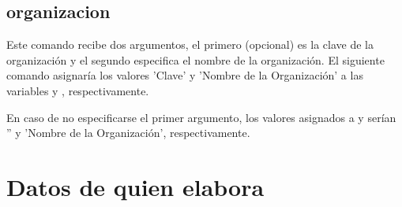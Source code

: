\subsection{organizacion}
\label{ssec:org}

    Este comando recibe dos argumentos, el primero (opcional) es la clave de la organización y el segundo especifica el nombre de la organización. El siguiente comando asignaría los valores 'Clave' y 'Nombre de la Organización' a las variables  y , respectivamente.
    
    \begin{code}
    \end{code}
    
\noindent En caso de no especificarse el primer argumento, los valores asignados a  y  serían '' y 'Nombre de la Organización', respectivamente.
    
    \begin{code}
    \end{code}
    
    
\section{Datos de quien elabora}
    
